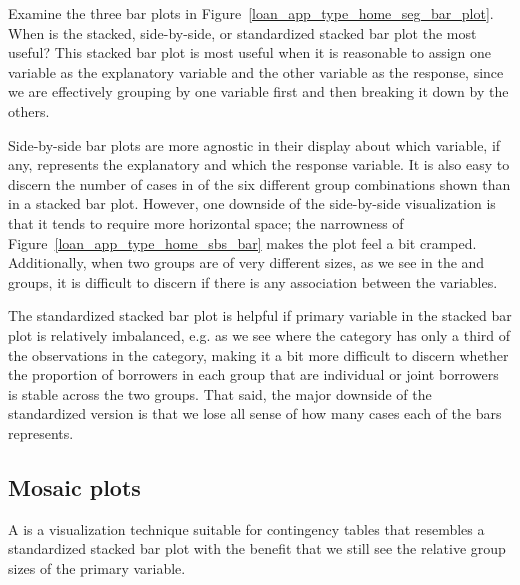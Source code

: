 \begin{example}{Examine the three bar plots in
    Figure~\ref{loan_app_type_home_seg_bar_plot}.
    When is the stacked, side-by-side, or standardized
    stacked bar plot the most useful?}
  This stacked bar plot is most useful when it is reasonable
  to assign one variable as the explanatory variable and
  the other variable as the response, since we are effectively
  grouping by one variable first and then breaking it down by
  the others.

  Side-by-side bar plots are more agnostic in their display
  about which variable, if any, represents the explanatory
  and which the response variable.
  It is also easy to discern the number of cases
  in of the six different group combinations shown than
  in a stacked bar plot.
  However, one downside of the side-by-side visualization
  is that it tends to require more horizontal space;
  the narrowness of Figure~\ref{loan_app_type_home_sbs_bar}
  makes the plot feel a bit cramped.
  Additionally, when two groups are of very different sizes,
  as we see in the  and  groups,
  it is difficult to discern if there is any association
  between the variables.

  The standardized stacked bar plot is helpful if primary
  variable in the stacked bar plot is relatively imbalanced,
  e.g. as we see where the  category has only
  a third of the observations in the 
  category, making it a bit more difficult
  to discern whether the proportion of borrowers
  in each group that are individual or joint borrowers
  is stable across the two groups.
  That said, the major downside of the standardized version
  is that we lose all sense of how many cases each of the
  bars represents.
\end{example}


\subsection{Mosaic plots}
\label{mosaic_plots_subsection}

A  is a visualization technique
suitable for contingency tables that resembles
a standardized stacked bar plot with the benefit
that we still see the relative group sizes of the
primary variable.


